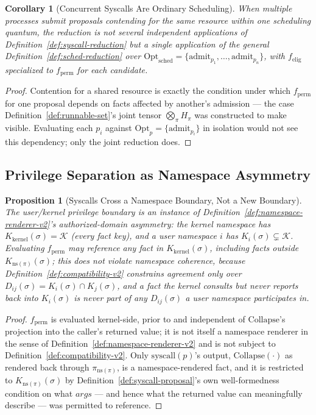 \documentclass[11pt]{article}
\newtheorem{proposition}{Proposition}[section]
\newtheorem{corollary}{Corollary}[section]
\begin{document}
\begin{corollary}[Concurrent Syscalls Are Ordinary Scheduling]
\label{cor:concurrent-syscall}
When multiple processes submit proposals contending for the same resource within one scheduling quantum, the reduction is not several independent applications of Definition~\ref{def:syscall-reduction} but a single application of the general Definition~\ref{def:sched-reduction} over $\mathrm{Opt}_{\mathrm{sched}} = \{\mathrm{admit}_{p_1}, \ldots, \mathrm{admit}_{p_n}\}$, with $f_{\mathrm{elig}}$ specialized to $f_{\mathrm{perm}}$ for each candidate.
\end{corollary}
\begin{proof}
Contention for a shared resource is exactly the condition under which $f_{\mathrm{perm}}$ for one proposal depends on facts affected by another's admission --- the case Definition~\ref{def:runnable-set}'s joint tensor $\bigotimes_\pi H_\pi$ was constructed to make visible. Evaluating each $p_i$ against $\mathrm{Opt}_p = \{\mathrm{admit}_{p_i}\}$ in isolation would not see this dependency; only the joint reduction does.
\end{proof}

\subsection{Privilege Separation as Namespace Asymmetry}

\begin{proposition}[Syscalls Cross a Namespace Boundary, Not a New Boundary]
\label{prop:syscall-namespace}
The user/kernel privilege boundary is an instance of Definition~\ref{def:namespace-renderer-v2}'s authorized-domain asymmetry: the kernel namespace has $K_{\mathrm{kernel}}(\sigma) = \mathcal{K}$ (every fact key), and a user namespace $i$ has $K_i(\sigma) \subsetneq \mathcal{K}$. Evaluating $f_{\mathrm{perm}}$ may reference any fact in $K_{\mathrm{kernel}}(\sigma)$, including facts outside $K_{\mathrm{ns}(\pi)}(\sigma)$; this does not violate namespace coherence, because Definition~\ref{def:compatibility-v2} constrains agreement only over $D_{ij}(\sigma) = K_i(\sigma) \cap K_j(\sigma)$, and a fact the kernel consults but never reports back into $K_i(\sigma)$ is never part of any $D_{ij}(\sigma)$ a user namespace participates in.
\end{proposition}
\begin{proof}
$f_{\mathrm{perm}}$ is evaluated kernel-side, prior to and independent of $\mathrm{Collapse}$'s projection into the caller's returned value; it is not itself a namespace renderer in the sense of Definition~\ref{def:namespace-renderer-v2} and is not subject to Definition~\ref{def:compatibility-v2}. Only $\mathrm{syscall}(p)$'s output, $\mathrm{Collapse}(\cdot)$ as rendered back through $\pi_{\mathrm{ns}(\pi)}$, is a namespace-rendered fact, and it is restricted to $K_{\mathrm{ns}(\pi)}(\sigma)$ by Definition~\ref{def:syscall-proposal}'s own well-formedness condition on what $\mathit{args}$ --- and hence what the returned value can meaningfully describe --- was permitted to reference.
\end{proof}
\end{document}
